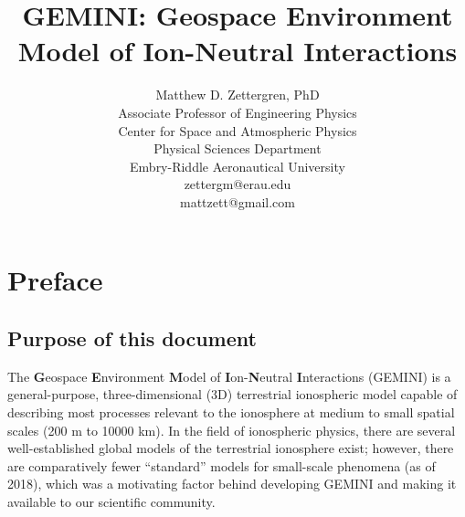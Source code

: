 \documentclass[11pt,letterpaper]{article}
\begin{document}
\setlength{\parindent}{0mm}
\setlength{\parskip}{0.4cm}




\title{\textbf{GEMINI}:  \textbf{G}eospace \textbf{E}nvironment \textbf{M}odel of \textbf{I}on-\textbf{N}eutral \textbf{I}nteractions}
\author{Matthew D. Zettergren, PhD\\ Associate Professor of Engineering Physics\\ Center for Space and Atmospheric Physics\\ Physical Sciences Department \\Embry-Riddle Aeronautical University\\zettergm@erau.edu\\mattzett@gmail.com}
\maketitle

\tableofcontents

\pagebreak








\section{Preface}

\subsection{Purpose of this document}

The \textbf{G}eospace \textbf{E}nvironment \textbf{M}odel of \textbf{I}on-\textbf{N}eutral \textbf{I}nteractions (GEMINI) is a general-purpose, three-dimensional (3D) terrestrial ionospheric model capable of describing most processes relevant to the ionosphere at medium to small spatial scales (200 m to 10000 km).  In the field of ionospheric physics, there are several well-established global models of the terrestrial ionosphere exist; however, there are comparatively fewer ``standard'' models for small-scale phenomena (as of 2018), which was a motivating factor behind developing GEMINI and making it available to our scientific community.  
\end{document}
